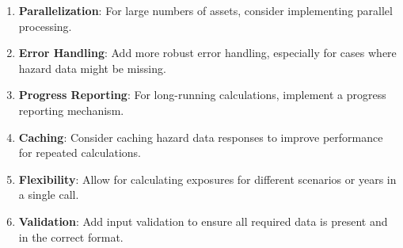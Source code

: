 \documentclass{article}
\begin{document}
\begin{enumerate}
    \item \textbf{Parallelization}: For large numbers of assets, consider implementing parallel processing.

    \item \textbf{Error Handling}: Add more robust error handling, especially for cases where hazard data might be missing.

    \item \textbf{Progress Reporting}: For long-running calculations, implement a progress reporting mechanism.

    \item \textbf{Caching}: Consider caching hazard data responses to improve performance for repeated calculations.

    \item \textbf{Flexibility}: Allow for calculating exposures for different scenarios or years in a single call.

    \item \textbf{Validation}: Add input validation to ensure all required data is present and in the correct format.
\end{enumerate}
\end{document}
